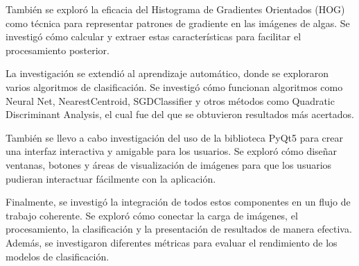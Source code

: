\documentclass[conference]{IEEEtran}
\begin{document}
También se exploró la eficacia del Histograma de Gradientes Orientados (HOG) como técnica para representar patrones de gradiente en las imágenes de algas. Se investigó cómo calcular y extraer estas características para facilitar el procesamiento posterior.

La investigación se extendió al aprendizaje automático, donde se exploraron varios algoritmos de clasificación. Se investigó cómo funcionan algoritmos como Neural Net\cite{Neural}, NearestCentroid\cite{nearest}, SGDClassifier\cite{sgdc} y otros métodos como Quadratic Discriminant Analysis\cite{qda}, el cual fue del que se obtuvieron resultados más acertados. 

También se llevo a cabo investigación del uso de la biblioteca PyQt5\cite{pyqt5} para crear una interfaz interactiva y amigable para los usuarios. Se exploró cómo diseñar ventanas, botones y áreas de visualización de imágenes para que los usuarios pudieran interactuar fácilmente con la aplicación.

Finalmente, se investigó la integración de todos estos componentes en un flujo de trabajo coherente. Se exploró cómo conectar la carga de imágenes, el procesamiento, la clasificación y la presentación de resultados de manera efectiva. Además, se investigaron diferentes métricas para evaluar el rendimiento de los modelos de clasificación.
\end{document}
